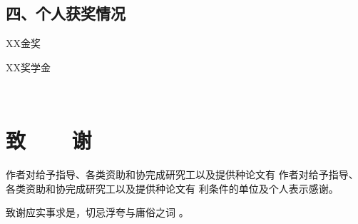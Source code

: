 \vspace{22pt}
\subsection*{四、个人获奖情况}
\begin{enumerate}[label={[\arabic*]},itemindent=2em,wide]
	\item XX金奖
	\item XX奖学金
\end{enumerate}
\fi

\newpage

\ifblindreview
\else

{~}
\vspace{18pt}
\section{{致~~~~谢}} %
\renewcommand*{\baselinestretch}{1.0} %
\setlength{\baselineskip}{20pt} %

作者对给予指导、各类资助和协完成研究工以及提供种论文有 作者对给予指导、各类资助和协完成研究工以及提供种论文有 利条件的单位及个人表示感谢。

致谢应实事求是，切忌浮夸与庸俗之词 。

\newpage
\fi
